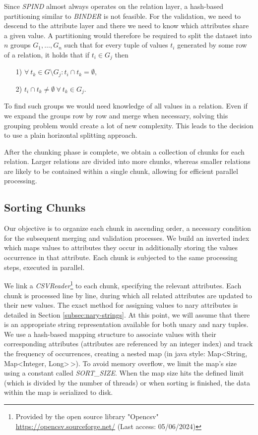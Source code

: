 Since \textit{SPIND} almost always operates on the relation layer, a hash-based partitioning similar to \textit{BINDER} is not feasible. For the validation, we need to descend to the attribute layer and there we need to know which attributes share a given value. A partitioning would therefore be required to split the dataset into $n$ groups $G_1, \dots, G_n$ such that for every tuple of values $t_i$ generated by some row of a relation, it holds that if $t_i \in G_j$ then 
\begin{itemize}
    \item[1)] $\forall \: t_k \in G \setminus G_j : t_i \cap t_k = \emptyset$,
    \item[2)] $t_i \cap t_k \not = \emptyset \: \forall \: t_k \in G_j$.
\end{itemize}
To find such groups we would need knowledge of all values in a relation. Even if we expand the groups row by row and merge when necessary, solving this grouping problem would create a lot of new complexity. This leads to the decision to use a plain horizontal splitting approach.

After the chunking phase is complete, we obtain a collection of chunks for each relation. Larger relations are divided into more chunks, whereas smaller relations are likely to be contained within a single chunk, allowing for efficient parallel processing.

\subsection{Sorting Chunks} \label{subsec:spind_sort}
Our objective is to organize each chunk in ascending order, a necessary condition for the subsequent merging and validation processes. We build an inverted index which maps values to attributes they occur in additionally storing the values occurrence in that attribute. Each chunk is subjected to the same processing steps, executed in parallel.

We link a \textit{CSVReader}\footnote{Provided by the open source library "Opencsv" \url{https://opencsv.sourceforge.net/} (Last access: 05/06/2024)} to each chunk, specifying the relevant attributes. Each chunk is processed line by line, during which all related attributes are updated to their new values. The exact method for assigning values to nary attributes is detailed in Section \ref{subsec:nary-strings}. At this point, we will assume that there is an appropriate string representation available for both unary and nary tuples. We use a hash-based mapping structure to associate values with their corresponding attributes (attributes are referenced by an integer index) and track the frequency of occurrences, creating a nested map (in java style: Map<String, Map<Integer, Long>$\!\,$>). To avoid memory overflow, we limit the map's size using a constant called \textit{SORT\_SIZE}. When the map size hits the defined limit (which is divided by the number of threads) or when sorting is finished, the data within the map is serialized to disk.

